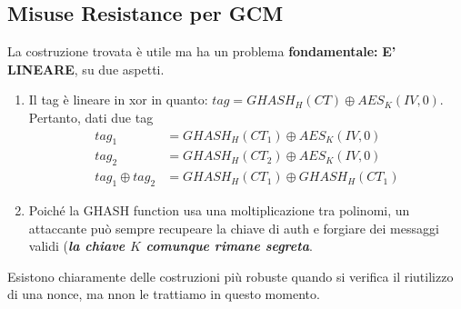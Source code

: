 \subsection{Misuse Resistance per GCM}
La costruzione trovata è utile ma ha un problema \textbf{fondamentale:} \textbf{E' LINEARE}, su due aspetti. 
\begin{enumerate}
    \item Il tag è lineare in xor in quanto: $tag=GHASH_H(CT)\oplus{AES_K(IV,0)}$. Pertanto, dati due tag
    \begin{equation*}
        \begin{aligned}
            tag_1&=GHASH_H(CT_1)\oplus{AES_K(IV,0)}\\
            tag_2&=GHASH_H(CT_2)\oplus{AES_K(IV,0)}\\
            tag_1\oplus{tag_2}&=GHASH_H(CT_1)\oplus{GHASH_H(CT_1)}
        \end{aligned}
    \end{equation*}
    \item Poiché la GHASH function usa una moltiplicazione tra polinomi, un attaccante può sempre recupeare la chiave di auth e forgiare dei messaggi validi (\textit{\textbf{la chiave $K$ comunque rimane segreta}}.
\end{enumerate}
Esistono chiaramente delle costruzioni più robuste quando si verifica il riutilizzo di una nonce, ma nnon le trattiamo in questo momento.